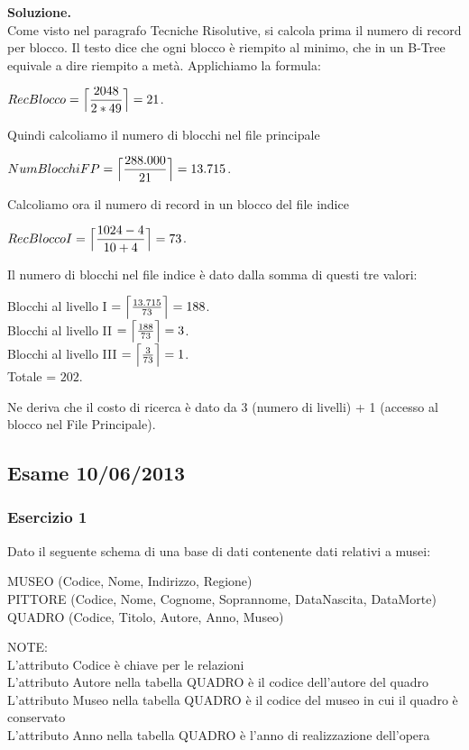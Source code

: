 \noindent\textbf{\fontsize{14pt}{1em}Soluzione.}\\
Come visto nel paragrafo Tecniche Risolutive, si calcola prima il numero di record per blocco. Il testo dice che 
ogni blocco è riempito al minimo, che in un B-Tree equivale a dire riempito a metà. Applichiamo la formula:
\begin{center}
 $RecBlocco = \Bigl\lceil \dfrac{2048}{2*49} \Bigr\rceil = 21$.\\
\end{center}
Quindi calcoliamo il numero di blocchi nel file principale
\begin{center}
 $NumBlocchiFP = \Bigl\lceil \dfrac{288.000}{21} \Bigr\rceil = 13.715$.\\
\end{center}
Calcoliamo ora il numero di record in un blocco del file indice
\begin{center}
 $RecBloccoI = \Bigl\lceil \dfrac{1024-4}{10+4} \Bigr\rceil = 73$.\\
\end{center}
Il numero di blocchi nel file indice è dato dalla somma di questi tre valori:
\begin{center}
 Blocchi al livello I $= \Bigl\lceil \frac{13.715}{73} \Bigr\rceil = 188$.\\
 
 Blocchi al livello II $= \Bigl\lceil \frac{188}{73} \Bigr\rceil = 3$.\\
 
 Blocchi al livello III $= \Bigl\lceil \frac{3}{73} \Bigr\rceil = 1$.\\
 Totale = $202$.
\end{center}
Ne deriva che il costo di ricerca è dato da 3 (numero di livelli) + 1 (accesso al blocco nel File Principale).
\newpage
\subsection{Esame 10/06/2013}
  \subsubsection{Esercizio 1}
  Dato il seguente schema di una base di dati contenente dati relativi a musei:
  \begin{center}
  MUSEO (Codice, Nome, Indirizzo, Regione)\\
  PITTORE (Codice, Nome, Cognome, Soprannome, DataNascita, DataMorte)\\
  QUADRO (Codice, Titolo, Autore, Anno, Museo)\\
  \end{center}
  NOTE:\\
  L'attributo Codice è chiave per le relazioni\\
  L'attributo Autore nella tabella QUADRO è il codice dell'autore del quadro\\
  L'attributo Museo nella tabella QUADRO è il codice del museo in cui il quadro è conservato\\
  L'attributo Anno nella tabella QUADRO è l'anno di realizzazione dell'opera\\

